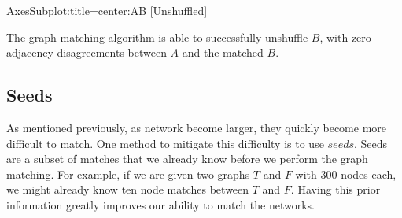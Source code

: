 \documentclass[letterpaper,10pt,english]{jupyterBook}
\begin{document}
\begin{sphinxVerbatim}[commandchars=\\\{\}]
\PYGZlt{}AxesSubplot:title=\PYGZob{}\PYGZsq{}center\PYGZsq{}:\PYGZsq{}A\PYGZhy{}B [Unshuffled]\PYGZsq{}\PYGZcb{}\PYGZgt{}
\end{sphinxVerbatim}

\noindent{}

\sphinxAtStartPar
The graph matching algorithm is able to successfully unshuffle \(B\), with zero adjacency disagreements between \(A\) and the matched \(B\).


\subsection{Seeds}
\label{\detokenize{applications/ch9/graph-matching-vertex:seeds}}
\sphinxAtStartPar
As mentioned previously, as network become larger, they quickly become more difficult to match. One method to mitigate this difficulty is to use \(\textit{seeds}\). Seeds are a subset of matches that we already know before we perform the graph matching. For example, if we are given two graphs \(T\) and \(F\) with 300 nodes each, we might already know ten node matches between \(T\) and \(F\). Having this prior information greatly improves our ability to match the networks.
\end{document}
